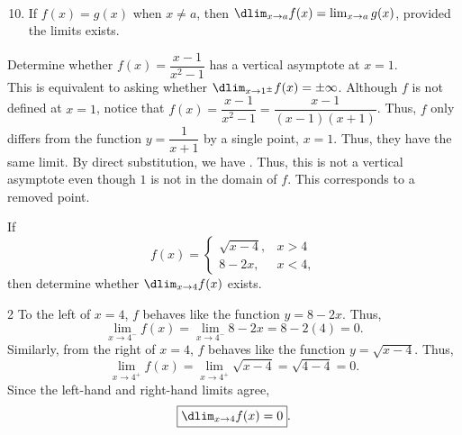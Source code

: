 \documentclass{book}
\begin{document}
\begin{Thm}\mbox{}\\
\begin{enumerate}
\setcounter{enumi}{9}
\item If $f(x) = g(x)$ when $x\neq a$, then $\dlim_{x\to a} f(x) = \lim_{x\to a} g(x)$, provided the limits exists.
\end{enumerate}
\end{Thm}\vs

\begin{Exam} Determine whether $f(x) = \dfrac{x-1}{x^2-1}$ has a vertical asymptote at $x = 1$.\\

This is equivalent to asking whether $\dlim_{x\to 1^\pm} f(x) = \pm\infty$. Although $f$ is not defined at $x= 1$, notice that $f(x) = \dfrac{x-1}{x^2-1} = \dfrac{x-1}{(x-1)(x+1)}$. Thus, $f$ only differs from the function $y = \dfrac{1}{x+1}$ by a single point, $x=1$. Thus, they have the same limit. By direct substitution, we have . Thus, this is not a vertical asymptote even though $1$ is not in the domain of $f$. This corresponds to a removed point. 
\end{Exam}\vs

\begin{Exam} If \[f(x) = \left\{\begin{array}{ll} \sqrt{x-4}, & x > 4\\ 8-2x, & x < 4,\end{array}\right.\] then determine whether $\dlim_{x\to 4} f(x)$ exists.
\begin{multicols}{2}
To the left of $x=4$, $f$ behaves like the function $y = 8-2x$. Thus, \[\lim_{x\to 4^-} f(x) = \lim_{x\to 4^-} 8-2x  = 8-2(4) = 0.\] Similarly, from the right of $x=4$, $f$ behaves like the function $y = \sqrt{x-4}$. Thus, \[\lim_{x\to 4^+} f(x) = \lim_{x\to 4^+} \sqrt{x-4} = \sqrt{4-4} = 0.\] Since the left-hand and right-hand limits agree, \[\fbox{$\dlim_{x\to 4} f(x) = 0$}. \]
\begin{center}
\end{center}
\end{multicols}
\end{Exam}\vs
\end{document}
